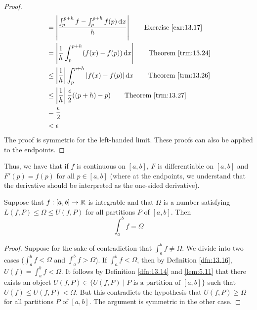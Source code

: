 \documentclass[../main.tex]{subfiles}
\begin{document}
\begin{theorem}
\begin{proof}
\begin{align*}
            &= \left| \frac{\int_p^{p+h}f-\int_p^{p+h}f(p)\dd{x}}{h} \right|\tag*{Exercise \ref{exr:13.17}}\\
            &= \left| \frac{1}{h}\int_p^{p+h}(f(x)-f(p))\dd{x} \right|\tag*{Theorem \ref{trm:13.24}}\\
            &\leq \left| \frac{1}{h} \right|\int_p^{p+h}|f(x)-f(p)|\dd{x}\tag*{Theorem \ref{trm:13.26}}\\
            &\leq \left| \frac{1}{h} \right|\frac{\epsilon}{2}((p+h)-p)\tag*{Theorem \ref{trm:13.27}}\\
            &= \frac{\epsilon}{2}\\
            &< \epsilon
        \end{align*}
        \endgroup
        The proof is symmetric for the left-handed limit. These proofs can also be applied to the endpoints.
    \end{proof}
\end{theorem}

\begin{remark}\label{rmk:14.2}
    Thus, we have that if $f$ is continuous on $[a,b]$, $F$ is differentiable on $[a,b]$ and $F'(p)=f(p)$ for all $p\in[a,b]$ (where at the endpoints, we understand that the derivative should be interpreted as the one-sided derivative).
\end{remark}

\begin{lemma}\label{lem:14.3}
    Suppose that $f:[a,b]\to\mathbb{R}$ is integrable and that $\Omega$ is a number satisfying $L(f,P)\leq\Omega\leq U(f,P)$ for all partitions $P$ of $[a,b]$. Then
    \begin{equation*}
        \int_a^bf = \Omega
    \end{equation*}
    \begin{proof}
        Suppose for the sake of contradiction that $\int_a^bf\neq\Omega$. We divide into two cases ($\int_a^bf<\Omega$ and $\int_a^bf>\Omega$). If $\int_a^bf<\Omega$, then by Definition \ref{dfn:13.16}, $U(f)=\int_a^bf<\Omega$. It follows by Definition \ref{dfn:13.14} and \ref{lem:5.11} that there exists an object $U(f,P)\in\{U(f,P)\mid P\text{ is a partition of }[a,b]\}$ such that $U(f)\leq U(f,P)<\Omega$. But this contradicts the hypothesis that $U(f,P)\geq\Omega$ for all partitions $P$ of $[a,b]$. The argument is symmetric in the other case.
    \end{proof}
\end{lemma}
\end{document}
